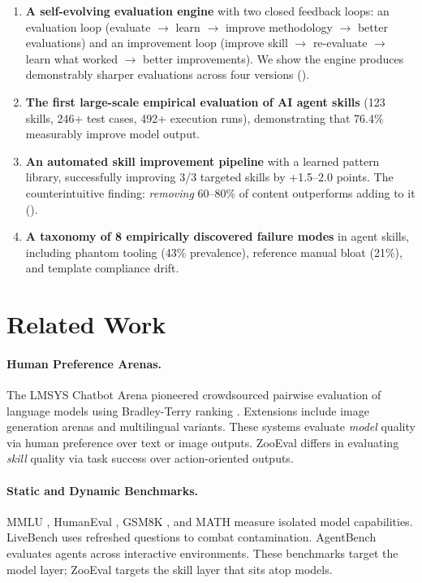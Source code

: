 \documentclass[11pt,a4paper]{article}
\begin{document}
\begin{enumerate}[leftmargin=*]
    \item \textbf{A self-evolving evaluation engine} with two closed feedback loops: an evaluation loop (evaluate $\rightarrow$ learn $\rightarrow$ improve methodology $\rightarrow$ better evaluations) and an improvement loop (improve skill $\rightarrow$ re-evaluate $\rightarrow$ learn what worked $\rightarrow$ better improvements). We show the engine produces demonstrably sharper evaluations across four versions ().
    \item \textbf{The first large-scale empirical evaluation of AI agent skills} (123 skills, 246+ test cases, 492+ execution runs), demonstrating that 76.4\% measurably improve model output.
    \item \textbf{An automated skill improvement pipeline} with a learned pattern library, successfully improving 3/3 targeted skills by +1.5--2.0 points. The counterintuitive finding: \emph{removing} 60--80\% of content outperforms adding to it ().
    \item \textbf{A taxonomy of 8 empirically discovered failure modes} in agent skills, including phantom tooling (43\% prevalence), reference manual bloat (21\%), and template compliance drift.
\end{enumerate}

\section{Related Work}
\label{sec:related}

\paragraph{Human Preference Arenas.}
The LMSYS Chatbot Arena \citep{chiang2024chatbot} pioneered crowdsourced pairwise evaluation of language models using Bradley-Terry ranking \citep{bradley1952rank}. Extensions include image generation arenas and multilingual variants. These systems evaluate \emph{model} quality via human preference over text or image outputs. ZooEval differs in evaluating \emph{skill} quality via task success over action-oriented outputs.

\paragraph{Static and Dynamic Benchmarks.}
MMLU \citep{hendrycks2021mmlu}, HumanEval \citep{chen2021humaneval}, GSM8K \citep{cobbe2021gsm8k}, and MATH \citep{hendrycks2021math} measure isolated model capabilities. LiveBench \citep{white2024livebench} uses refreshed questions to combat contamination. AgentBench \citep{liu2023agentbench} evaluates agents across interactive environments. These benchmarks target the model layer; ZooEval targets the skill layer that sits atop models.
\end{document}
